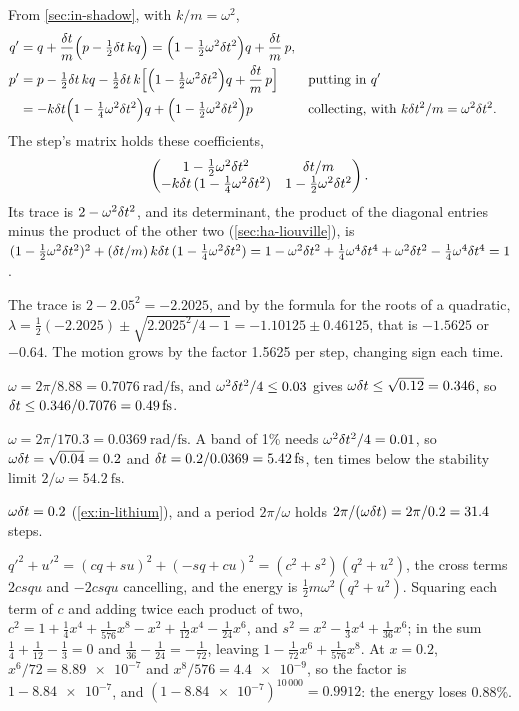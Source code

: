 From \cref{sec:in-shadow}, with $k/m = \omega^2$,
\begin{align*}
   q' &= q + \frac{\delta t}{m}\Bigl(p - \tfrac12\delta t\,kq\Bigr)
   = \Bigl(1 - \tfrac12\omega^2\delta t^2\Bigr)q + \frac{\delta t}{m}\,p ,\\
   p' &= p - \tfrac12\delta t\,kq - \tfrac12\delta t\,k\Bigl[\Bigl(1 - \tfrac12
   \omega^2\delta t^2\Bigr)q + \frac{\delta t}{m}\,p\Bigr]
   && \text{putting in $q'$}\\
   &= -k\delta t\Bigl(1 - \tfrac14\omega^2\delta t^2\Bigr)q + \Bigl(1 - \tfrac12
   \omega^2\delta t^2\Bigr)p && \text{collecting, with $k\delta t^2/m =
   \omega^2\delta t^2$.}
\end{align*}
The step's matrix holds these coefficients,
\begin{equation*}
   \begin{pmatrix} 1 - \frac12\omega^2\delta t^2 & \delta t/m\\
   -k\delta t\,(1 - \frac14\omega^2\delta t^2) & 1 - \frac12\omega^2\delta t^2
   \end{pmatrix} .
\end{equation*}
Its trace is $2 - \omega^2\delta t^2$, and its determinant, the product of the
diagonal entries minus the product of the other two
(\cref{sec:ha-liouville}), is $(1 - \frac12\omega^2\delta t^2)^2 + (\delta t/m)\,
k\delta t\,(1 - \frac14\omega^2\delta t^2) = 1 - \omega^2\delta t^2 + \frac14\omega^4
\delta t^4 + \omega^2\delta t^2 - \frac14\omega^4\delta t^4 = 1$.

The trace is $2 - 2.05^2 = -2.2025$, and by the
formula for the roots of a quadratic, $\lambda = \frac12(-2.2025) \pm
\sqrt{2.2025^2/4 - 1} = -1.10125 \pm 0.46125$, that is $-1.5625$ or $-0.64$. The motion grows by
the factor 1.5625 per step, changing sign each time.

$\omega = 2\pi/8.88 =
\SI{0.7076}{\radian\per\femto\second}$, and $\omega^2\delta t^2/4 \le 0.03$
gives $\omega\delta t \le \sqrt{0.12} = 0.346$, so $\dt \le 0.346/0.7076 =
\SI{0.49}{\femto\second}$.

$\omega = 2\pi/170.3 =
\SI{0.0369}{\radian\per\femto\second}$. A band of 1\% needs
$\omega^2\delta t^2/4 = 0.01$, so $\omega\delta t = \sqrt{0.04} = 0.2$ and $\dt =
0.2/0.0369 = \SI{5.42}{\femto\second}$, ten times below the stability
limit $2/\omega = \SI{54.2}{\femto\second}$.

$\omega\delta t = 0.2$ (\cref{ex:in-lithium}), and
a period $2\pi/\omega$ holds $2\pi/(\omega\delta t) = 2\pi/0.2 = 31.4$
steps.

$q'^2 + u'^2 = (cq + su)^2 + (-sq + cu)^2 =
(c^2 + s^2)(q^2 + u^2)$, the cross terms $2csqu$ and $-2csqu$ cancelling,
and the energy is $\frac12 m\omega^2(q^2 + u^2)$. Squaring each term of
$c$ and adding twice each product of two, $c^2 = 1 + \frac14x^4 +
\frac1{576}x^8 - x^2 + \frac1{12}x^4 - \frac1{24}x^6$, and $s^2 = x^2 -
\frac13x^4 + \frac1{36}x^6$; in the sum $\frac14 + \frac1{12} - \frac13 =
0$ and $\frac1{36} - \frac1{24} = -\frac1{72}$, leaving $1 -
\frac1{72}x^6 + \frac1{576}x^8$. At $x = 0.2$, $x^6/72 = \num{8.89e-7}$
and $x^8/576 = \num{4.4e-9}$, so the factor is $1 - \num{8.84e-7}$, and
$(1 - \num{8.84e-7})^{10\,000} = 0.9912$: the energy loses 0.88\%.

